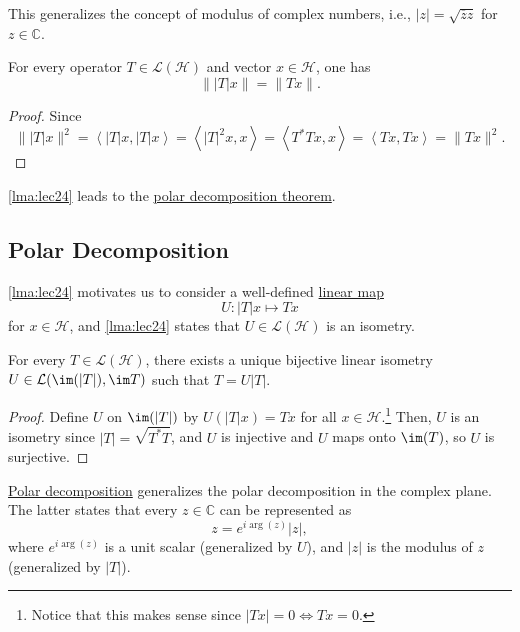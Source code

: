 This generalizes the concept of modulus of complex numbers, i.e., \(\vert z \vert = \sqrt{\overline{z} z} \) for \(z\in \mathbb{C} \).

\begin{lemma}\label{lma:lec24}
	For every operator \(T\in \mathcal{L} (\mathcal{H} )\) and vector \(x\in \mathcal{H} \), one has
	\[
		\lVert \vert T \vert x \rVert = \lVert Tx \rVert.
	\]
\end{lemma}
\begin{proof}
	Since
	\[
		\lVert \vert T \vert x \rVert ^2
		= \left\langle \vert T \vert x, \vert T \vert x \right\rangle
		= \left\langle \vert T \vert ^2 x, x \right\rangle
		= \left\langle T^{\ast} Tx, x \right\rangle
		= \left\langle Tx, Tx \right\rangle
		= \lVert Tx \rVert ^2.
	\]
\end{proof}

\autoref{lma:lec24} leads to the \hyperref[thm:polar-decomposition]{polar decomposition theorem}.

\subsection{Polar Decomposition}
\autoref{lma:lec24} motivates us to consider a well-defined \hyperref[def:linear-op]{linear map}
\[
	U\colon \vert T \vert x \mapsto Tx
\]
for \(x\in \mathcal{H} \), and \autoref{lma:lec24} states that \(U\in \mathcal{L} (\mathcal{H} )\) is an isometry.

\begin{theorem}\label{thm:polar-decomposition}
	For every \(T\in \mathcal{L} (\mathcal{H} )\), there exists a unique bijective linear isometry \(U\in \mathcal{L} (\im (\vert T \vert ), \im T)\) such that \(T = U\vert T \vert \).
\end{theorem}
\begin{proof}
	Define \(U\) on \(\im(\vert T \vert )\) by \(U(\vert T \vert x) = Tx\) for all \(x\in \mathcal{H} \).\footnote{Notice that this makes sense since \(\vert Tx \vert = 0 \iff Tx = 0\).} Then, \(U\) is an isometry since \(\vert T \vert = \sqrt{T ^{\ast} T} \), and \(U\) is injective and \(U\) maps onto \(\im (T)\), so \(U\) is surjective.
\end{proof}

\hyperref[thm:polar-decomposition]{Polar decomposition} generalizes the polar decomposition in the complex plane. The latter states that every \(z\in \mathbb{C} \) can be represented as
\[
	z = e^{i \arg (z)} \vert z \vert,
\]
where \(e^{i \arg(z)}\) is a unit scalar (generalized by \(U\)), and \(\vert z \vert \) is the modulus of \(z\) (generalized by \(\vert T \vert\)).

